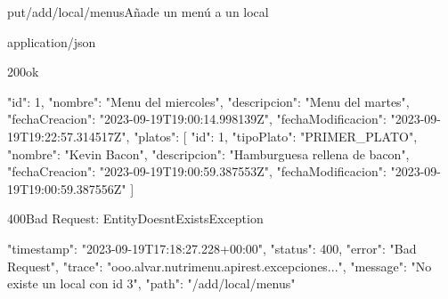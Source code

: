 \begin{apiRoute}{put}{/add/local/menus}{Añade un menú a un local}
	\begin{routeParameter}
	\end{routeParameter}
	
	\begin{routeResponse}{application/json}
		\begin{routeResponseItem}{200}{ok}
			\begin{routeResponseItemBody}
{
    "id": 1,
    "nombre": "Menu del miercoles",
    "descripcion": "Menu del martes",
    "fechaCreacion": "2023-09-19T19:00:14.998139Z",
    "fechaModificacion": "2023-09-19T19:22:57.314517Z",
    "platos": [
        {
            "id": 1,
            "tipoPlato": "PRIMER_PLATO",
            "nombre": "Kevin Bacon",
            "descripcion": "Hamburguesa rellena de bacon",
            "fechaCreacion": "2023-09-19T19:00:59.387553Z",
            "fechaModificacion": "2023-09-19T19:00:59.387556Z"
        }
    ]
}
			\end{routeResponseItemBody}
		\end{routeResponseItem}
		\begin{routeResponseItem}{400}{Bad Request: EntityDoesntExistsException}
			\begin{routeResponseItemBody}
{
    "timestamp": "2023-09-19T17:18:27.228+00:00",
    "status": 400,
    "error": "Bad Request",
    "trace": "ooo.alvar.nutrimenu.apirest.excepciones...",
    "message": "No existe un local con id 3",
    "path": "/add/local/menus"
}
			\end{routeResponseItemBody}
		\end{routeResponseItem}
	\end{routeResponse}
\end{apiRoute}

